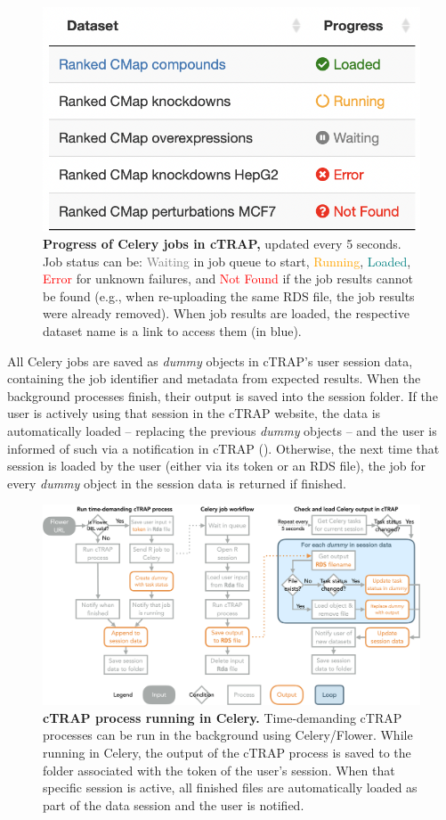 \begin{figure}[!h]
  \includegraphics[width=.5\textwidth]{images/ctrap/job-progress}
  \centering
  \caption[Progress of Celery jobs in cTRAP]{\textbf{Progress of Celery jobs in cTRAP,} updated every 5 seconds. Job status can be: \textcolor{gray}{Waiting} in job queue to start, \textcolor{orange}{Running}, \textcolor{teal}{Loaded}, \textcolor{red}{Error} for unknown failures, and \textcolor{red}{Not Found} if the job results cannot be found (e.g., when re-uploading the same RDS file, the job results were already removed). When job results are loaded, the respective dataset name is a link to access them (in blue).}
  \label{fig:job-progress}
\end{figure}

All Celery jobs are saved as \emph{dummy} objects in cTRAP's user session data, containing the job identifier and metadata from expected results. When the background processes finish, their output is saved into the session folder. If the user is actively using that session in the cTRAP website, the data is automatically loaded -- replacing the previous \emph{dummy} objects -- and the user is informed of such via a notification in cTRAP (). Otherwise, the next time that session is loaded by the user (either via its token or an RDS file), the job for every \emph{dummy} object in the session data is returned if finished.

\begin{figure}[!htb]
  \includegraphics[width=\textwidth]{images/ctrap/celery-job}
  \centering
  \caption[cTRAP process running in Celery]{\textbf{cTRAP process running in Celery.} Time-demanding cTRAP processes can be run in the background using Celery/Flower. While running in Celery, the output of the cTRAP process is saved to the folder associated with the token of the user's session. When that specific session is active, all finished files are automatically loaded as part of the data session and the user is notified.}
  \label{fig:ctrap-celery}
\end{figure}

